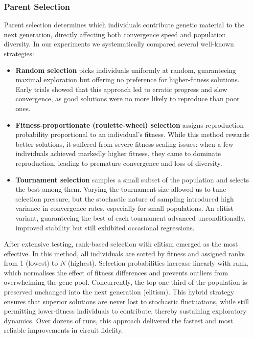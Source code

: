 \documentclass[11pt,a4paper]{article}
\begin{document}
\subsubsection*{Parent Selection}
Parent selection determines which individuals contribute genetic material to the next generation, directly affecting both convergence speed and population diversity. In our experiments we systematically compared several well‐known strategies:

\begin{itemize}
    \item \textbf{Random selection} picks individuals uniformly at random, guaranteeing maximal exploration but offering no preference for higher‐fitness solutions. Early trials showed that this approach led to erratic progress and slow convergence, as good solutions were no more likely to reproduce than poor ones.
    \item \textbf{Fitness‐proportionate (roulette‐wheel) selection} assigns reproduction probability proportional to an individual’s fitness. While this method rewards better solutions, it suffered from severe fitness scaling issues: when a few individuals achieved markedly higher fitness, they came to dominate reproduction, leading to premature convergence and loss of diversity.
    \item \textbf{Tournament selection} samples a small subset of the population and selects the best among them. Varying the tournament size allowed us to tune selection pressure, but the stochastic nature of sampling introduced high variance in convergence rates, especially for small populations. An elitist variant, guaranteeing the best of each tournament advanced unconditionally, improved stability but still exhibited occasional regressions.
\end{itemize}

After extensive testing, rank‐based selection with elitism emerged as the most effective. In this method, all individuals are sorted by fitness and assigned ranks from 1 (lowest) to $N$ (highest). Selection probabilities increase linearly with rank, which normalises the effect of fitness differences and prevents outliers from overwhelming the gene pool. Concurrently, the top one‐third of the population is preserved unchanged into the next generation (elitism). This hybrid strategy ensures that superior solutions are never lost to stochastic fluctuations, while still permitting lower‐fitness individuals to contribute, thereby sustaining exploratory dynamics. Over dozens of runs, this approach delivered the fastest and most reliable improvements in circuit fidelity.
\end{document}

